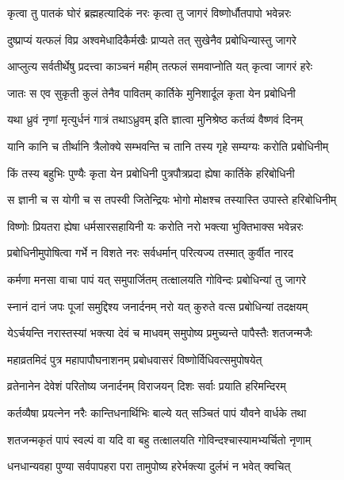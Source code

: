 \twolineshloka
{कृत्वा तु पातकं घोरं ब्रह्महत्यादिकं नरः}%
{कृत्वा तु जागरं विष्णोर्धौतपापो भवेन्नरः}

\twolineshloka
{दुष्प्राप्यं यत्फलं विप्र अश्वमेधादिकैर्मखैः}%
{प्राप्यते तत् सुखेनैव प्रबोधिन्यास्तु जागरे}

\twolineshloka
{आप्लुत्य सर्वतीर्थेषु प्रदत्त्वा काञ्चनं महीम्}%
{तत्फलं समवाप्नोति यत् कृत्वा जागरं हरेः}

\twolineshloka
{जातः स एव सुकृती कुलं तेनैव पावितम्}%
{कार्तिके मुनिशार्दूल कृता येन प्रबोधिनी}

\twolineshloka
{यथा ध्रुवं नृणां मृत्युर्धनं गात्रं तथाऽध्रुवम्}%
{इति ज्ञात्वा मुनिश्रेष्ठ कर्तव्यं वैष्णवं दिनम्}

\twolineshloka
{यानि कानि च तीर्थानि त्रैलोक्ये सम्भवन्ति च}%
{तानि तस्य गृहे सम्यग्यः करोति प्रबोधिनीम्}

\twolineshloka
{किं तस्य बहुभिः पुण्यैः कृता येन प्रबोधिनी}%
{पुत्रपौत्रप्रदा ह्येषा कार्तिके हरिबोधिनी}

\twolineshloka
{स ज्ञानी च स योगी च स तपस्वी जितेन्द्रियः}%
{भोगो मोक्षश्च तस्यास्ति उपास्ते हरिबोधिनीम्}

\twolineshloka
{विष्णोः प्रियतरा ह्येषा धर्मसारसहायिनी}%
{यः करोति नरो भक्त्या भुक्तिभाक्स भवेन्नरः}

\twolineshloka
{प्रबोधिनीमुपोषित्वा गर्भे न विशते नरः}%
{सर्वधर्मान् परित्यज्य तस्मात् कुर्वीत नारद}

\twolineshloka
{कर्मणा मनसा वाचा पापं यत् समुपार्जितम्}%
{तत्क्षालयति गोविन्दः प्रबोधिन्यां तु जागरे}

\twolineshloka
{स्नानं दानं जपः पूजां समुद्दिश्य जनार्दनम्}%
{नरो यत् कुरुते वत्स प्रबोधिन्यां तदक्षयम्}

\twolineshloka
{येऽर्चयन्ति नरास्तस्यां भक्त्या देवं च माधवम्}%
{समुपोष्य प्रमुच्यन्ते पापैस्तैः शतजन्मजैः}

\twolineshloka
{महाव्रतमिदं पुत्र महापापौघनाशनम्}%
{प्रबोधवासरं विष्णोर्विधिवत्समुपोषयेत्}

\twolineshloka
{व्रतेनानेन देवेशं परितोष्य जनार्दनम्}%
{विराजयन् दिशः सर्वाः प्रयाति हरिमन्दिरम्}

\twolineshloka
{कर्तव्यैषा प्रयत्नेन नरैः कान्तिधनार्थिभिः}%
{बाल्ये यत् सञ्चितं पापं यौवने वार्धके तथा}

\twolineshloka
{शतजन्मकृतं पापं स्वल्पं वा यदि वा बहु}%
{तत्क्षालयति गोविन्दश्चास्यामभ्यर्चितो नृणाम्}

\twolineshloka
{धनधान्यवहा पुण्या सर्वपापहरा परा}%
{तामुपोष्य हरेर्भक्त्या दुर्लभं न भवेत् क्वचित्}


